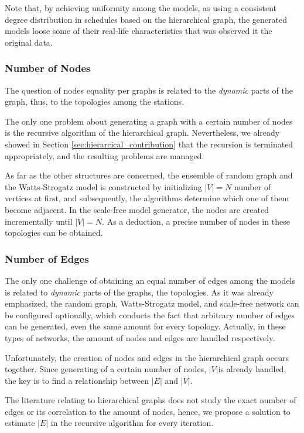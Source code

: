 Note that, by achieving uniformity among the models, as using a consistent degree distribution in schedules based on the hierarchical graph, the generated models loose some of their real-life characteristics that was observed it the original data.

\subsubsection{Number of Nodes}

The question of nodes equality per graphs is related to the \textit{dynamic} parts of the graph, thus, to the topologies among the stations.

The only one problem about generating a graph with a certain number of nodes is the recursive algorithm of the hierarchical graph. Nevertheless, we already showed in Section \ref{sec:hierarcical_contribution} that the recursion is terminated appropriately, and the resulting problems are managed.

As far as the other structures are concerned, the ensemble of random graph and the Watts-Strogatz model is constructed by initializing $|V| = N$ number of vertices at first, and subsequently, the algorithms determine which one of them become adjacent. In the scale-free model generator, the nodes are created incrementally until $|V| = N$. As a deduction, a precise number of nodes in these topologies can be obtained.

\subsubsection{Number of Edges}

The only one challenge of obtaining an equal number of edges among the models is related to \textit{dynamic} parts of the graphs, the topologies. As it was already emphasized, the random graph, Watts-Strogatz model, and scale-free network can be configured optionally, which conducts the fact that arbitrary number of edges can be generated, even the same amount for every topology. Actually, in these types of networks, the amount of nodes and edges are handled respectively.

Unfortunately, the creation of nodes and edges in the hierarchical graph occurs together. Since generating of a certain number of nodes, $|V|$is already handled, the key is to find a relationship between $|E|$ and $|V|$.

The literature relating to hierarchical graphs does not study the exact number of edges or its correlation to the amount of nodes, hence, we propose a solution to estimate $|E|$ in the recursive algorithm for every iteration.

